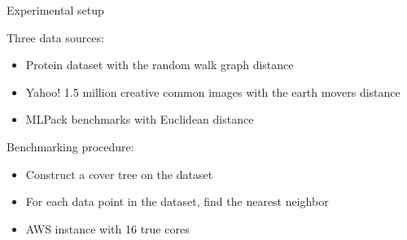 \begin{frame}{Experimental setup}
\Large

Three data sources:
\begin{itemize}
\item Protein dataset with the random walk graph distance
\item Yahoo! 1.5 million creative common images with the earth movers distance
\item MLPack benchmarks with Euclidean distance
\end{itemize}

\vspace{0.15in}
Benchmarking procedure:
\begin{itemize}
\item Construct a cover tree on the dataset
\item For each data point in the dataset, find the nearest neighbor
\item AWS instance with 16 true cores
\end{itemize}

\end{frame}
